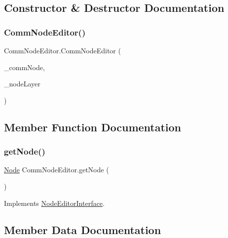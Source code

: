 \subsection{Constructor \& Destructor Documentation}
\mbox{\label{class_comm_node_editor_aca81fedc55a41cfbd42f8e00f05a7f32}} 
\subsubsection{\texorpdfstring{Comm\+Node\+Editor()}{CommNodeEditor()}}
{\footnotesize\ttfamily Comm\+Node\+Editor.\+Comm\+Node\+Editor (\begin{DoxyParamCaption}\item[{\mbox{\hyperlink{class_comm_input_node}{Comm\+Input\+Node}}}]{\+\_\+comm\+Node,  }\item[{int}]{\+\_\+node\+Layer }\end{DoxyParamCaption})}



\subsection{Member Function Documentation}
\mbox{\label{class_comm_node_editor_ad578649fe7c3775e0b91c1acdb5e738a}} 
\subsubsection{\texorpdfstring{get\+Node()}{getNode()}}
{\footnotesize\ttfamily \mbox{\hyperlink{class_node}{Node}} Comm\+Node\+Editor.\+get\+Node (\begin{DoxyParamCaption}{ }\end{DoxyParamCaption})}



Implements \mbox{\hyperlink{interface_node_editor_interface_a56e2abaedf17d7fbf2be90d521ec9363}{Node\+Editor\+Interface}}.



\subsection{Member Data Documentation}
\mbox{\label{class_comm_node_editor_a36b489d896bf2c7cb2128f3b139008d2}} 
